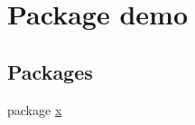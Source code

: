 \hypertarget{namespacedemo}{}\section{Package demo}
\label{namespacedemo}
\subsection*{Packages}
\begin{DoxyCompactItemize}
\item 
package \mbox{\hyperlink{namespacedemo_1_1x}{x}}
\end{DoxyCompactItemize}

